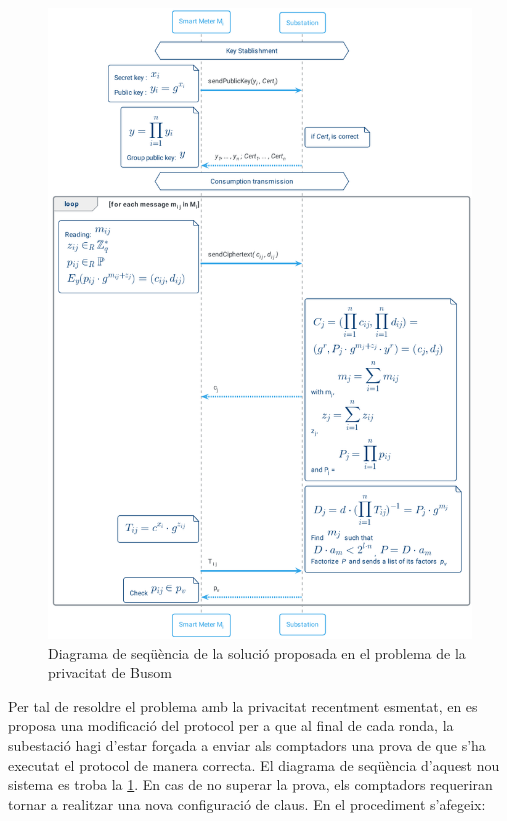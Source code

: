 \begin{figure}[H]
	\centering
	\includegraphics[width=13cm]{umls/garra.png}
	\caption{Diagrama de seqüència de la solució proposada en el problema de la privacitat de Busom}
	\label{fig:garra}
\end{figure}
Per tal de resoldre el problema amb la privacitat recentment esmentat, en \cite{repair-busom} es proposa una modificació del protocol per a que al final de cada ronda, la subestació hagi d'estar forçada a enviar als comptadors una prova de que s'ha executat el protocol de manera correcta. El diagrama de seqüència d'aquest nou sistema es troba la \cref{fig:garra}. En cas de no superar la prova, els comptadors requeriran tornar a realitzar una nova configuració de claus. En el procediment s'afegeix:
